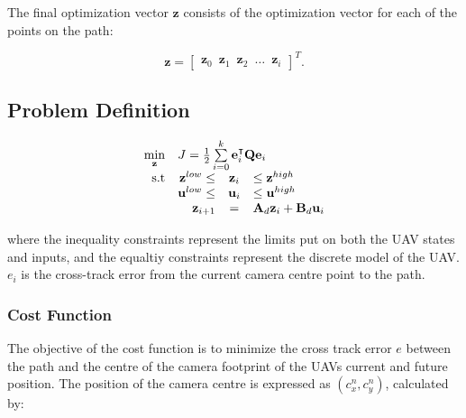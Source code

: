 The final optimization vector $\mathbf{z}$ consists of the optimization vector for each of the points on the path:

\begin{equation}
	\mathbf{z} = 
	\begin{bmatrix}
		\mathbf{z}_0 \hspace{6pt} \mathbf{z}_1 \hspace{6pt} \mathbf{z}_2 \hspace{6pt} \hdots \hspace{6pt} \mathbf{z}_i
	\end{bmatrix}^T.
\end{equation}


\subsection*{Problem Definition}

\begin{equation}
	\begin{array}{rrclcl}
		\displaystyle \min_{\mathbf{z}} & \multicolumn{3}{l}{J = \frac{1}{2} \sum\limits_{i=0}^k \mathbf{e}^\intercal_i \mathbf{Q} \mathbf{e}_i} \\
		\textrm{s.t}
		& \mathbf{z}^{low} \leq & \mathbf{z}_i & \leq \mathbf{z}^{high} \\
		& \mathbf{u}^{low} \leq & \mathbf{u}_i & \leq \mathbf{u}^{high} \\
		& \displaystyle \mathbf{z}_{i+1} & = & \mathbf{A}_d \mathbf{z}_i + \mathbf{B}_d \mathbf{u}_i
	\end{array}
\end{equation}

where the inequality constraints represent the limits put on both the UAV states and inputs, and the equaltiy constraints represent the discrete model of the UAV. $e_i$ is the cross-track error from the current camera centre point to the path.


\subsubsection*{Cost Function}

The objective of the cost function is to minimize the cross track error $e$ between the path and the centre of the camera footprint of the UAVs current and future position. The position of the camera centre is expressed as $(c_x^n, c_y^n)$, calculated by:

